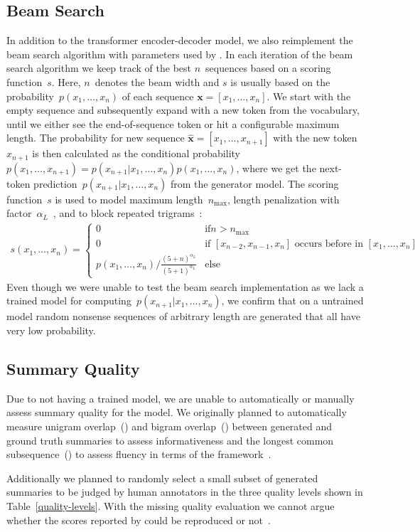 \subsection{Beam Search}

In addition to the transformer encoder-decoder model, we also reimplement the beam search algorithm with parameters used by \citeauthor{LiuL2019}.
In each iteration of the beam search algorithm we keep track of the best \(n\)~sequences based on a scoring function~\(s\).
Here, \(n\)~denotes the beam width and \(s\) is usually based on the probability~\(p(x_1,\ldots,x_n)\) of each sequence \(\mathbf{x} = [x_1,\ldots,x_n]\).
We start with the empty sequence and subsequently expand with a new token from the vocabulary, until we either see the end-of-sequence token or hit a configurable maximum length.
The probability for new sequence \(\mathbf{\hat x} = [x_1,\ldots,x_{n+1}]\) with the new token \(x_{n+1}\) is then calculated as the conditional probability~\( p(x_1,\ldots,x_{n+1}) = p(x_{n+1}|x_1,\ldots,x_n)p(x_1,\ldots,x_n) \), where we get the next-token prediction~\( p(x_{n+1}|x_1,\ldots,x_n) \) from the generator model.
The scoring function~\(s\) is used to model maximum length~\(n_\text{max}\), length penalization with factor~\(\alpha_L\)~\cite{WuSCLNMKCGMKSJL2016}, and to block repeated trigrams~\cite{PaulusXS2018}:
\begin{align*}
    s(x_1,\ldots,x_n) = \begin{cases}
        0 & \text{if} n > n_\text{max} \\
        0 & \text{if \([x_{n-2},x_{n-1},x_n]\) occurs before in  \([x_1,\ldots,x_n]\)} \\
        p(x_1,\ldots,x_n) / \frac{(5 + n)^{\alpha_L}}{(5 + 1)^{\alpha_L}} & \text{else}
    \end{cases}
\end{align*}
Even though we were unable to test the beam search implementation as we lack a trained model for computing~\( p(x_{n+1}|x_1,\ldots,x_n) \), we confirm that on a untrained model random nonsense sequences of arbitrary length are generated that all have very low probability.

\subsection{Summary Quality}

Due to not having a trained model, we are unable to automatically or manually assess summary quality for the \BertSumAbs model.
We originally planned to automatically measure unigram overlap~() and bigram overlap~() between generated and ground truth summaries to assess informativeness and the longest common subsequence~(\RougeL) to assess fluency in terms of the \Rouge framework~\cite{Lin2004}.

Additionally we planned to randomly select a small subset of generated summaries to be judged by human annotators in the three quality levels shown in Table~\ref{quality-levels}.
With the missing quality evaluation we cannot argue whether the \Rouge scores reported by \citeauthor{LiuL2019} could be reproduced or not~\cite{LiuL2019}.
